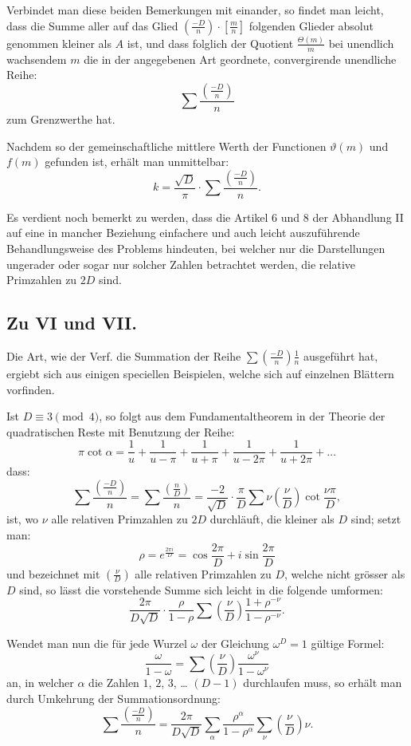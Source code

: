 \documentclass[12pt,a4paper]{article}
\begin{document}
Verbindet man diese beiden Bemerkungen mit einander, so findet man leicht, dass die Summe aller
auf das Glied $\left(\frac{-D}{n}\right) \cdot \left[\frac{m}{n}\right]$ folgenden Glieder absolut genommen kleiner als $A$ ist, und dass
folglich der Quotient $\frac{\Theta(m)}{m}$ bei unendlich wachsendem $m$ die in der angegebenen Art geordnete,
convergirende unendliche Reihe:
\[
\sum \frac{\left(\frac{-D}{n}\right)}{n}
\]
zum Grenzwerthe hat.

Nachdem so der gemeinschaftliche mittlere Werth der Functionen $\vartheta(m)$ und $f(m)$ gefunden ist,
erhält man unmittelbar:
\[
k = \frac{\sqrt{D}}{\pi} \cdot \sum \frac{\left(\frac{-D}{n}\right)}{n}.
\]

Es verdient noch bemerkt zu werden, dass die Artikel 6 und 8 der Abhandlung II auf eine in mancher
Beziehung einfachere und auch leicht auszuführende Behandlungsweise des Problems hindeuten, bei welcher
nur die Darstellungen ungerader oder sogar nur solcher Zahlen betrachtet werden, die relative Primzahlen
zu $2D$ sind.


\subsection*{Zu VI und VII.}

Die Art, wie der Verf. die Summation der Reihe $\sum \left(\frac{-D}{n}\right) \frac{1}{n}$ ausgeführt hat, ergiebt sich aus
einigen speciellen Beispielen, welche sich auf einzelnen Blättern vorfinden.

Ist $D \equiv 3 \pmod{4}$, so folgt aus dem Fundamentaltheorem in der Theorie der quadratischen Reste mit
Benutzung der Reihe:
\[
\pi \cot \alpha = \frac{1}{u} + \frac{1}{u - \pi} + \frac{1}{u + \pi} + \frac{1}{u - 2\pi} + \frac{1}{u + 2\pi} + \ldots
\]
dass:
\[
\sum \frac{\left(\frac{-D}{n}\right)}{n} = \sum \frac{\left(\frac{n}{D}\right)}{n} = \frac{-2}{\sqrt{D}} \cdot \frac{\pi}{D} \sum \nu \left(\frac{\nu}{D}\right) \cot \frac{\nu \pi}{D},
\]
ist, wo $\nu$ alle relativen Primzahlen zu $2D$ durchläuft, die kleiner als $D$ sind; setzt man:
\[
\rho = e^{\frac{2\pi i}{D}} = \cos \frac{2\pi}{D} + i \sin \frac{2\pi}{D}
\]
und bezeichnet mit $\left(\frac{\nu}{D}\right)$ alle relativen Primzahlen zu $D$, welche nicht grösser als $D$ sind, so lässt
die vorstehende Summe sich leicht in die folgende umformen:
\[
\frac{2\pi}{D\sqrt{D}} \cdot \frac{\rho}{1 - \rho} \sum \left(\frac{\nu}{D}\right) \frac{1 + \rho^{-\nu}}{1 - \rho^{-\nu}}.
\]

Wendet man nun die für jede Wurzel $\omega$ der Gleichung $\omega^D = 1$ gültige Formel:
\[
\frac{\omega}{1 - \omega} = \sum \left(\frac{\nu}{D}\right) \frac{\omega^{\nu}}{1 - \omega^{\nu}}
\]
an, in welcher $\alpha$ die Zahlen $1$, $2$, $3$, \ldots{} $(D-1)$ durchlaufen muss, so erhält man durch Umkehrung
der Summationsordnung:
\[
\sum \frac{\left(\frac{-D}{n}\right)}{n} = \frac{2\pi}{D\sqrt{D}} \sum_{\alpha} \frac{\rho^{\alpha}}{1 - \rho^{\alpha}} \sum_{\nu} \left(\frac{\nu}{D}\right) \nu.
\]
\end{document}
